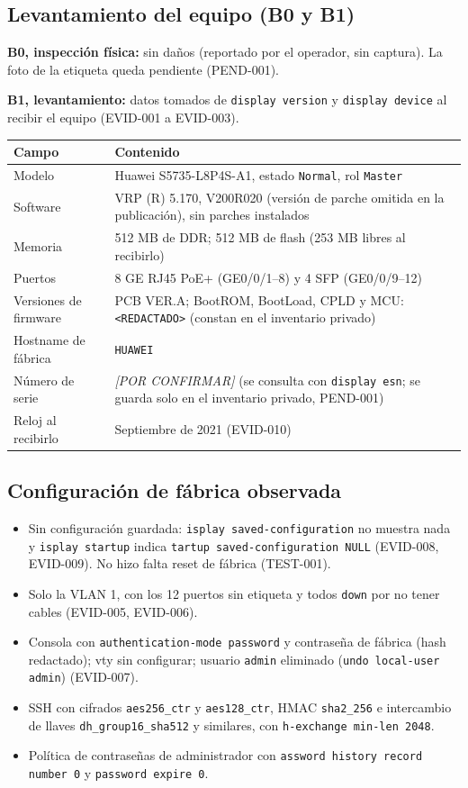 \documentclass[11pt,a4paper]{article}
\newcommand{\pc}{\textcolor{muted}{\textit{[POR CONFIRMAR]}}}
\newcommand{\cab}{\rowcolor{light}}
\newcommand{\fn}[1]{\texttt{\fnbreaks#1\fnend}}
\def\fnbreaks#1\fnend{\begingroup\fnactive\scantokens{#1\noexpand}\endgroup}
\gdef\fnactive{\catcode`\-=\active\catcode`\/=\active
  \def-{\char`\-\allowbreak}\def/{\char`\/\allowbreak}\let\_\fnus}
\newcommand{\fnus}{\textunderscore\allowbreak}
\begin{document}
\newpage
\subsection{Levantamiento del equipo (B0 y B1)}
\textbf{B0, inspección física:} sin daños (reportado por el operador, sin captura). La foto de la etiqueta queda pendiente (PEND-001).

\textbf{B1, levantamiento:} datos tomados de \texttt{display version} y \texttt{display device} al recibir el equipo (EVID-001 a EVID-003).

\begin{tabularx}{\textwidth}{L{4.2cm} Z}
  \toprule
  \cab\textbf{Campo} & \textbf{Contenido}\\
  \midrule
  Modelo & Huawei S5735-L8P4S-A1, estado \texttt{Normal}, rol \texttt{Master}\\
  Software & VRP (R) 5.170, V200R020 (versión de parche omitida en la publicación), sin parches instalados\\
  Memoria & 512 MB de DDR; 512 MB de flash (253 MB libres al recibirlo)\\
  Puertos & 8 GE RJ45 PoE+ (GE0/0/1--8) y 4 SFP (GE0/0/9--12)\\
  Versiones de firmware & PCB VER.A; BootROM, BootLoad, CPLD y MCU: \texttt{<REDACTADO>} (constan en el inventario privado)\\
  Hostname de fábrica & \texttt{HUAWEI}\\
  Número de serie & \pc{} (se consulta con \texttt{display esn}; se guarda solo en el inventario privado, PEND-001)\\
  Reloj al recibirlo & Septiembre de 2021 (EVID-010)\\
  \bottomrule
\end{tabularx}

\subsection{Configuración de fábrica observada}
\begin{itemize}
  \item Sin configuración guardada: \fn{display saved-configuration} no muestra nada y \fn{display startup} indica \fn{startup saved-configuration NULL} (EVID-008, EVID-009). No hizo falta reset de fábrica (TEST-001).
  \item Solo la VLAN 1, con los 12 puertos sin etiqueta y todos \texttt{down} por no tener cables (EVID-005, EVID-006).
  \item Consola con \texttt{authentication-mode password} y contraseña de fábrica (hash redactado); vty sin configurar; usuario \texttt{admin} eliminado (\texttt{undo local-user admin}) (EVID-007).
  \item SSH con cifrados \texttt{aes256\_ctr} y \texttt{aes128\_ctr}, HMAC \texttt{sha2\_256} e intercambio de llaves \texttt{dh\_group16\_sha512} y similares, con \fn{dh-exchange min-len 2048}.
  \item Política de contraseñas de administrador con \fn{password history record number 0} y \texttt{password expire 0}.
\end{itemize}
\end{document}
